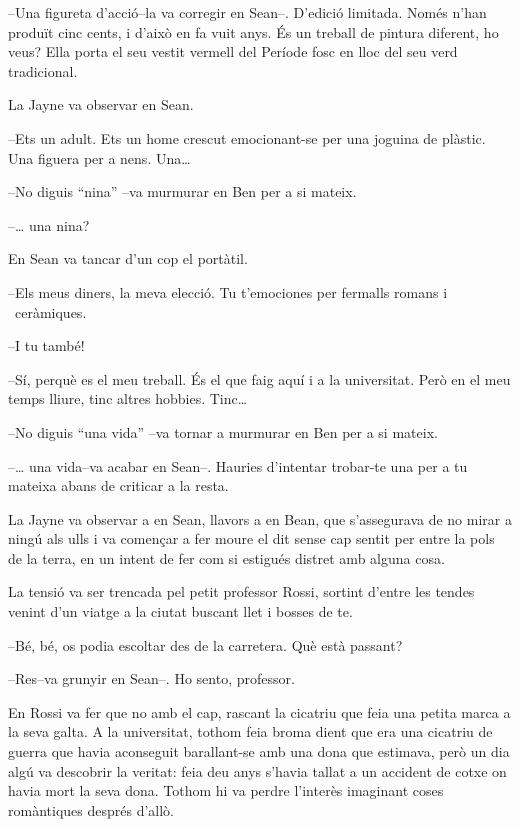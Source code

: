 --Una figureta d'acció--la va corregir en Sean--. D'edició limitada.
Només n'han produït cinc cents, i d'això en fa vuit anys. És un treball
de pintura diferent, ho veus? Ella porta el seu vestit vermell del
Període fosc en lloc del seu verd tradicional.

La Jayne va observar en Sean.

--Ets un adult. Ets un home crescut emocionant-se per una joguina de
plàstic. Una figuera per a nens. Una\ldots{}

--No diguis ``nina'' --va murmurar en Ben per a si mateix.

--\ldots{} una nina?

En Sean va tancar d'un cop el portàtil.

--Els meus diners, la meva elecció. Tu t'emociones per fermalls romans i
~ceràmiques.

--I tu també!

--Sí, perquè es el meu treball. És el que faig aquí i a la universitat.
Però en el meu temps lliure, tinc altres hobbies. Tinc\ldots{}

--No diguis ``una vida'' --va tornar a murmurar en Ben per a si mateix.

--\ldots{} una vida--va acabar en Sean--. Hauries d'intentar trobar-te
una per a tu mateixa abans de criticar a la resta.

La Jayne va observar a en Sean, llavors a en Bean, que s'assegurava de
no mirar a ningú als ulls i va començar a fer moure el dit sense cap
sentit per entre la pols de la terra, en un intent de fer com si
estigués distret amb alguna cosa.

La tensió va ser trencada pel petit professor Rossi, sortint d'entre les
tendes venint d'un viatge a la ciutat buscant llet i bosses de te.

--Bé, bé, os podia escoltar des de la carretera. Què està passant?

--Res--va grunyir en Sean--. Ho sento, professor.

En Rossi va fer que no amb el cap, rascant la cicatriu que feia una
petita marca a la seva galta. A la universitat, tothom feia broma dient
que era una cicatriu de guerra que havia aconseguit barallant-se amb una
dona que estimava, però un dia algú va descobrir la veritat: feia deu
anys s'havia tallat a un accident de cotxe on havia mort la seva dona.
Tothom hi va perdre l'interès imaginant coses romàntiques després
d'allò.

